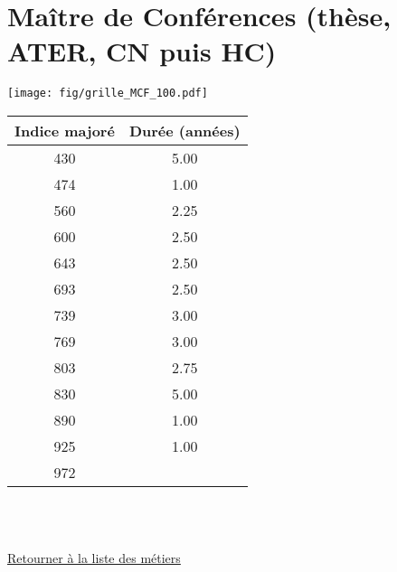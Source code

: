 \newpage 
 
\chapter{Maître de Conférences (thèse, ATER, CN puis HC)} 

\begin{minipage}{0.55\linewidth}\texttt{[image: fig/grille\_MCF\_100.pdf]}\end{minipage} 
\begin{minipage}{0.3\linewidth} 
 \begin{center} 

\begin{tabular}[htb]{|c|c|} 
\hline 
 Indice majoré &  Durée (années) \\ 
\hline \hline 
 430 &  5.00 \\ 
\hline 
 474 &  1.00 \\ 
\hline 
 560 &  2.25 \\ 
\hline 
 600 &  2.50 \\ 
\hline 
 643 &  2.50 \\ 
\hline 
 693 &  2.50 \\ 
\hline 
 739 &  3.00 \\ 
\hline 
 769 &  3.00 \\ 
\hline 
 803 &  2.75 \\ 
\hline 
 830 &  5.00 \\ 
\hline 
 890 &  1.00 \\ 
\hline 
 925 &  1.00 \\ 
\hline 
 972 &   \\ 
\hline 
\hline 
\end{tabular} 
\end{center} 
 \end{minipage} 

~\\ 
 


   
 \localtableofcontents 

~\\ 
 
 \hyperlink{page.2}{\noindent Retourner à la liste des métiers}

